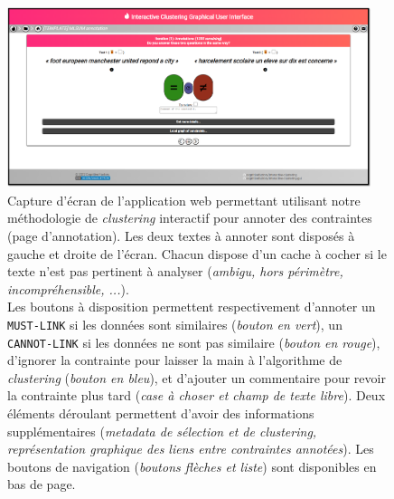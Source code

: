 			\begin{figure}[!htb]
				\centering
				\includegraphics[width=0.95\textwidth]{figures/etude-temps-annotation-0application-annotation}
				\caption{Capture d'écran de l'application web permettant utilisant notre méthodologie de \textit{clustering} interactif pour annoter des contraintes (page d'annotation). Les deux textes à annoter sont disposés à gauche et droite de l'écran. Chacun dispose d'un cache à cocher si le texte n'est pas pertinent à analyser (\textit{ambigu, hors périmètre, incompréhensible, ...}).\\
				Les boutons à disposition permettent respectivement d'annoter un \texttt{MUST-LINK} si les données sont similaires (\textit{bouton en vert}), un \texttt{CANNOT-LINK} si les données ne sont pas similaire (\textit{bouton en rouge}), d'ignorer la contrainte pour laisser la main à l'algorithme de \textit{clustering} (\textit{bouton en bleu}), et d'ajouter un commentaire pour revoir la contrainte plus tard (\textit{case à choser et champ de texte libre}). Deux éléments déroulant permettent d'avoir des informations supplémentaires (\textit{metadata de sélection et de \textit{clustering}, représentation graphique des liens entre contraintes annotées}). Les boutons de navigation (\textit{boutons flèches et liste}) sont disponibles en bas de page.}
				\label{figure:4.3.1-ETUDE-COUTS-TEMPS-ANNOTATION-APPLICATION-ANNOTATION}
			\end{figure}
